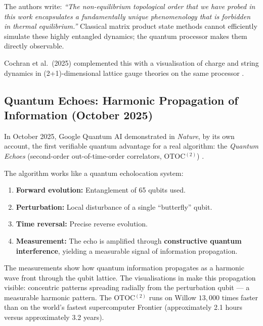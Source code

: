 The authors write: \textit{``The non-equilibrium topological order that we have
probed in this work encapsulates a fundamentally unique phenomenology that is
forbidden in thermal equilibrium.''} \cite{Will2025Nature}
Classical matrix product state methods cannot efficiently simulate these
highly entangled dynamics; the quantum processor makes them directly observable.

Cochran et al.\ (2025) complemented this with a visualisation of charge and string
dynamics in (2+1)-dimensional lattice gauge theories on the same processor
\cite{Cochran2025Nature}.

\subsection{Quantum Echoes: Harmonic Propagation of Information (October 2025)}

In October 2025, Google Quantum AI demonstrated in \textit{Nature}, by its own account, the first
verifiable quantum advantage for a real algorithm: the \emph{Quantum Echoes}
(second-order out-of-time-order correlators, OTOC$^{(2)}$) \cite{GoogleEchoes2025}.

The algorithm works like a quantum echolocation system:
\begin{enumerate}
    \item \textbf{Forward evolution:} Entanglement of 65 qubits used.
    \item \textbf{Perturbation:} Local disturbance of a single ``butterfly'' qubit.
    \item \textbf{Time reversal:} Precise reverse evolution.
    \item \textbf{Measurement:} The echo is amplified through \textbf{constructive
    quantum interference}, yielding a measurable signal of information propagation.
\end{enumerate}

\begin{keypoint}
The measurements show how quantum information propagates as a harmonic wave front
through the qubit lattice. The visualisations in \cite{GoogleEchoes2025} make this
propagation visible: concentric patterns spreading radially from the perturbation
qubit — a measurable harmonic pattern.
The OTOC$^{(2)}$ runs on Willow $13{,}000$ times faster than on the world's fastest
supercomputer Frontier (approximately 2.1 hours versus approximately 3.2 years).
\end{keypoint}

